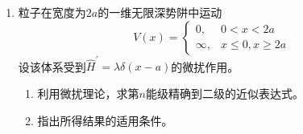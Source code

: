 \begin{enumerate}
{\begin{enumerate}
		$$
		\phi_{2}(r)=\frac{2 \sqrt{2}}{\sqrt{a b c}}
		\sin \frac{2 \pi x}{a}\sin \frac{\pi y}{b}\sin \frac{\pi z}{c},
		$$
		并有
		$$
		\psi_{\mathrm{space}}=\frac{1}{\sqrt{2}}
		\left[\phi_{1}(r_{1}) \phi_{2}(r_{2})
		-\phi_{2}(r_{1}) \phi_{1}(r_{2})\right],
		\quad
		E=\frac{\pi^{2} \hbar^{2}}{m}
		\left(\frac{5}{2a^{2}}+\frac{1}{b^{2}}+\frac{1}{c^{2}}\right).
$$
\end{enumerate}
\begin{note}
此题要求只写出空间部分，一般情况下还有自旋部分。当盒子是方盒子即 $a=b=c$ 时，第二激发态$\phi_{2}$ 存在简并，三重，对应的波函数有$ 3 $个。另外波函数的形式随着坐标原点的选择不同而不同（也可将坐标原点选在中心）。
\end{note}
\begin{note}
此题第三问在考虑粒子自旋的情况下基态是与前两问相同的，只有在限定为三重态的情况下才会改变基态，此题正确题目及结果应参照陈书7.7
\end{note}

}



\item 
粒子在宽度为$ 2a $的一维无限深势阱中运动
\[ 
V(x)=
\left\{
\begin{array}{lr}
	0,&0<x<2a\\
	\infty, & x\leq 0,x\geq2a
\end{array}
\right.
 \]
设该体系受到$\hat{H} ^{\prime} =\lambda\delta(x-a)$的微扰作用。
\begin{enumerate}
	\item
利用微扰理论，求第$n$能级精确到二级的近似表达式。

\item 
指出所得结果的适用条件。
\end{enumerate}


\end{enumerate}
